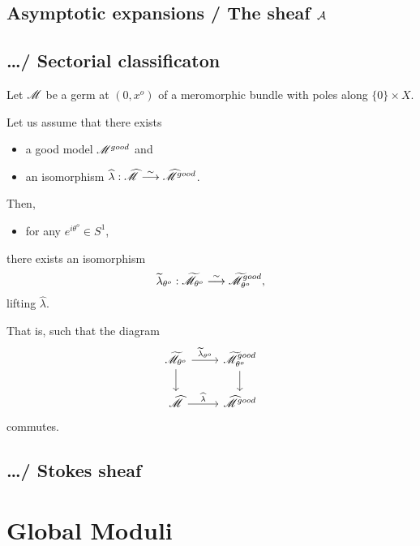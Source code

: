 \subsection{Asymptotic expansions / The sheaf $\mathcal{A}$}

\subsection{\dots / Sectorial classificaton} %
\begin{paracol}{2} %
  \switchcolumn{} %
  Let $\mathscr{M}$ be a germ at $(0,x^o)$ of a meromorphic bundle with poles along
  $\{0\}\times X$.
  \begin{thm}[II.5.12]
    Let us assume that there exists
    \begin{itemize}
      \item a good model $\mathscr{M}^{good}$ and
      \item an isomorphism $\widehat\lambda: \widehat{\mathscr{M}}
        \overset{\sim}{\longrightarrow}\widehat{\mathscr{M}}^{good}$.
    \end{itemize}
    Then,
    \begin{itemize}
      \item for any $e^{i\theta^o}\in S^1$,
    \end{itemize}
    there exists an isomorphism
    \[
      \widetilde\lambda_{\theta^o}: \widetilde{\mathscr{M}}_{\theta^o}
      \overset{\sim}{\longrightarrow}\widetilde{\mathscr{M}}^{good}_{\theta^o},
    \]
    lifting $\hat\lambda$.
  \end{thm}
  That is, such that the diagram
  \[ \begin{tikzcd}
      \tilde\sM_{\theta^o} \dar \rar{\tilde\lambda_{\theta^o}} &
        \tilde\sM^{good}_{\theta^o} \dar
        \\\hat\sM \rar{\hat\lambda} &
        \hat\sM^{good}
  \end{tikzcd} \]
  commutes.
\end{paracol} %

\subsection{\dots / Stokes sheaf}

\section{Global Moduli}
